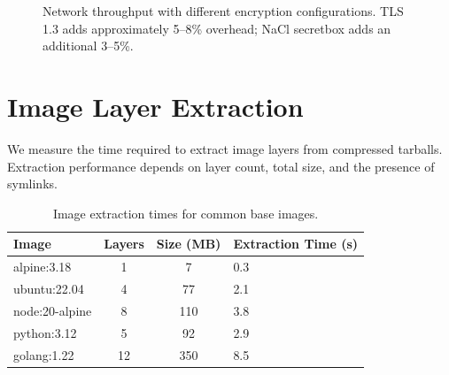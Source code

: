 \begin{figure}[htbp]
  \centering
  \caption{Network throughput with different encryption configurations.
    TLS 1.3 adds approximately 5--8\% overhead; NaCl secretbox adds
    an additional 3--5\%.}
  \label{fig:network-throughput}
\end{figure}

\section{Image Layer Extraction}
\label{sec:layer-extraction}

We measure the time required to extract image layers from compressed
tarballs. Extraction performance depends on layer count, total size,
and the presence of symlinks.

\begin{table}[htbp]
  \centering
  \caption{Image extraction times for common base images.}
  \label{tab:extraction-times}
  \begin{tabularx}{\textwidth}{l S[table-format=3.0] S[table-format=4.0] X}
    \toprule
    \textbf{Image} & {\textbf{Layers}} & {\textbf{Size (MB)}} & \textbf{Extraction Time (s)} \\
    \midrule
    alpine:3.18      & 1  & 7    & 0.3 \\
    ubuntu:22.04     & 4  & 77   & 2.1 \\
    node:20-alpine   & 8  & 110  & 3.8 \\
    python:3.12      & 5  & 92   & 2.9 \\
    golang:1.22      & 12 & 350  & 8.5 \\
    \bottomrule
  \end{tabularx}
\end{table}

